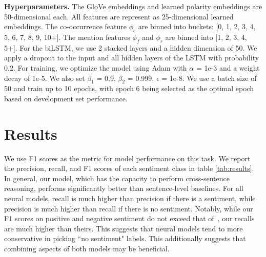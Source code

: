 \documentclass[11pt,a4paper]{article}
\begin{document}
\noindent\textbf{Hyperparameters.}
The GloVe embeddings and learned polarity embeddings are 50-dimensional each.
All features are represent as 25-dimensional learned embeddings. The co-occurrence feature $\phi_c$ are binned into buckets: [0, 1, 2, 3, 4, 5, 6, 7, 8, 9, 10+]. The mention features $\phi_f$ and $\phi_r$ are binned into [1, 2, 3, 4, 5+].
For the biLSTM, we use 2 stacked layers and a hidden dimension of 50. We apply a dropout to the input and all hidden layers of the LSTM with probability 0.2.
For training, we optimize the model using Adam with $\alpha$ = 1e-3 and a weight decay of 1e-5. We also set $\beta_1$ = 0.9, $\beta_2$ = 0.999, $\epsilon$ = 1e-8. We use a batch size of 50 and train up to 10 epochs, with epoch 6 being selected as the optimal epoch based on development set performance.

\section{Results}
We use F1 scores as the metric for model performance on this task.
We report the precision, recall, and F1 scores of each sentiment class in table \ref{tab:results}.
In general, our model, which has the capacity to perform cross-sentence reasoning, performs significantly better than sentence-level baselines.
For all neural models, recall is much higher than precision if there is a sentiment, while precision is much higher than recall if there is no sentiment. Notably, while our F1 scores on positive and negative sentiment do not exceed that of~, our recalls are much higher than theirs. This suggests that neural models tend to more conservative in picking ``no sentiment" labels. This additionally suggests that combining aspects of both models may be beneficial.
\end{document}
